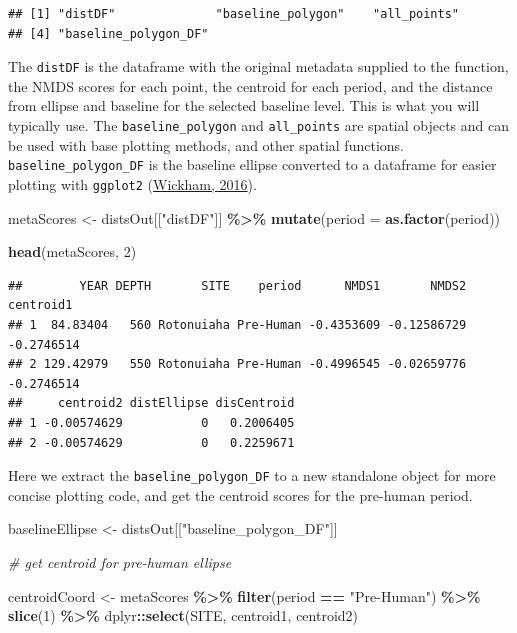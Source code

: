\documentclass[nofonts,]{tufte-handout}
\newenvironment{Shaded}{\begin{snugshade}}{\end{snugshade}}
\newcommand{\AttributeTok}[1]{\textcolor[rgb]{0.13,0.29,0.53}{#1}}
\newcommand{\CommentTok}[1]{\textcolor[rgb]{0.56,0.35,0.01}{\textit{#1}}}
\newcommand{\DecValTok}[1]{\textcolor[rgb]{0.00,0.00,0.81}{#1}}
\newcommand{\FunctionTok}[1]{\textcolor[rgb]{0.13,0.29,0.53}{\textbf{#1}}}
\newcommand{\NormalTok}[1]{#1}
\newcommand{\OtherTok}[1]{\textcolor[rgb]{0.56,0.35,0.01}{#1}}
\newcommand{\SpecialCharTok}[1]{\textcolor[rgb]{0.81,0.36,0.00}{\textbf{#1}}}
\newcommand{\StringTok}[1]{\textcolor[rgb]{0.31,0.60,0.02}{#1}}
\begin{document}
\begin{verbatim}
## [1] "distDF"              "baseline_polygon"    "all_points"         
## [4] "baseline_polygon_DF"
\end{verbatim}

The \texttt{distDF} is the dataframe with the original metadata supplied
to the function, the NMDS scores for each point, the centroid for each
period, and the distance from ellipse and baseline for the selected
baseline level. This is what you will typically use. The
\texttt{baseline\_polygon} and \texttt{all\_points} are spatial objects
and can be used with base plotting methods, and other spatial functions.
\texttt{baseline\_polygon\_DF} is the baseline ellipse converted to a
dataframe for easier plotting with \texttt{ggplot2}
(\protect\hyperlink{ref-wickham_2016_ggplot2}{Wickham, 2016}).

\begin{Shaded}
\begin{Highlighting}[]
\NormalTok{metaScores }\OtherTok{\textless{}{-}}\NormalTok{ distsOut[[}\StringTok{"distDF"}\NormalTok{]] }\SpecialCharTok{\%\textgreater{}\%}
  \FunctionTok{mutate}\NormalTok{(}\AttributeTok{period =} \FunctionTok{as.factor}\NormalTok{(period))}

\FunctionTok{head}\NormalTok{(metaScores, }\DecValTok{2}\NormalTok{)}
\end{Highlighting}
\end{Shaded}

\begin{verbatim}
##        YEAR DEPTH       SITE    period      NMDS1       NMDS2  centroid1
## 1  84.83404   560 Rotonuiaha Pre-Human -0.4353609 -0.12586729 -0.2746514
## 2 129.42979   550 Rotonuiaha Pre-Human -0.4996545 -0.02659776 -0.2746514
##     centroid2 distEllipse disCentroid
## 1 -0.00574629           0   0.2006405
## 2 -0.00574629           0   0.2259671
\end{verbatim}

Here we extract the \texttt{baseline\_polygon\_DF} to a new standalone
object for more concise plotting code, and get the centroid scores for
the pre-human period.

\begin{Shaded}
\begin{Highlighting}[]
\NormalTok{baselineEllipse }\OtherTok{\textless{}{-}}\NormalTok{ distsOut[[}\StringTok{"baseline\_polygon\_DF"}\NormalTok{]]}

\CommentTok{\# get centroid for pre{-}human ellipse}

\NormalTok{centroidCoord }\OtherTok{\textless{}{-}}\NormalTok{ metaScores }\SpecialCharTok{\%\textgreater{}\%} 
  \FunctionTok{filter}\NormalTok{(period }\SpecialCharTok{==} \StringTok{"Pre{-}Human"}\NormalTok{) }\SpecialCharTok{\%\textgreater{}\%}
  \FunctionTok{slice}\NormalTok{(}\DecValTok{1}\NormalTok{) }\SpecialCharTok{\%\textgreater{}\%}
\NormalTok{  dplyr}\SpecialCharTok{::}\FunctionTok{select}\NormalTok{(SITE, centroid1, centroid2)}
\end{Highlighting}
\end{Shaded}
\end{document}
